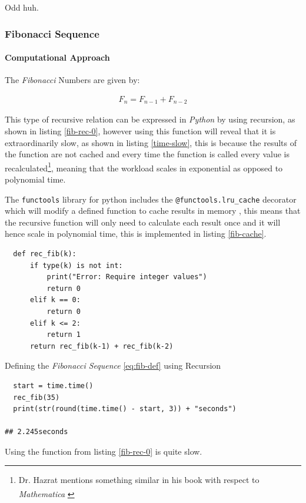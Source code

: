 \documentclass[11pt]{article}
\begin{document}
Odd huh.

\subsubsection{Fibonacci Sequence}
\label{sec:orgce236c8}
\paragraph{Computational Approach}
\label{define-the-fibonacci-numbers}
The \emph{Fibonacci} Numbers are given by:

\begin{align}
F_n = F_{n-1} + F_{n-2} \label{eq:fib-def}
\end{align}

This type of recursive relation can be expressed in \emph{Python} by using recursion,
as shown in listing \ref{fib-rec-0}, however using this function will reveal that it
is extraordinarily slow, as shown in listing \ref{time-slow}, this is because the
results of the function are not cached and every time the function is called
every value is recalculated\footnote{Dr. Hazrat mentions something similar in his book with respect to
\emph{Mathematica}\textsuperscript{\textregistered}
\cite[Ch. 13]{hazratMathematicaProblemCenteredApproach2015}}, meaning that the workload scales in
exponential as opposed to polynomial time.

The \texttt{functools} library for python includes the \texttt{@functools.lru\_cache} decorator
which will modify a defined function to cache results in memory
\cite{FunctoolsHigherorderFunctions}, this means that the recursive function will
only need to calculate each result once and it will hence scale in polynomial
time, this is implemented in listing \ref{fib-cache}.


\begin{listing}[htbp]
\begin{verbatim}
  def rec_fib(k):
      if type(k) is not int:
          print("Error: Require integer values")
          return 0
      elif k == 0:
          return 0
      elif k <= 2:
          return 1
      return rec_fib(k-1) + rec_fib(k-2)
\end{verbatim}
\caption{\label{fib-rec-0}Defining the \emph{Fibonacci Sequence} \eqref{eq:fib-def} using Recursion}
\end{listing}

\begin{listing}[htbp]
\begin{verbatim}
  start = time.time()
  rec_fib(35)
  print(str(round(time.time() - start, 3)) + "seconds")

## 2.245seconds
\end{verbatim}
\caption{\label{time-slow}Using the function from listing \ref{fib-rec-0} is quite slow.}
\end{listing}
\end{document}
